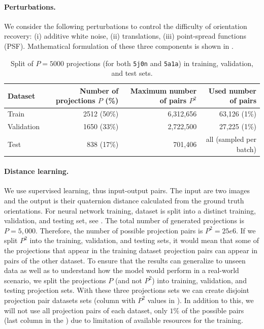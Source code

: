 \paragraph{Perturbations.}
We consider the following perturbations to control the difficulty of orientation recovery: (i) additive white noise, (ii) translations, (iii) point-spread functions (PSF). Mathematical formulation of these three components is shown in .

\begin{table}[ht!]
    \centering
    \begin{tabular}{lrrr}
        \toprule
        Dataset & Number of projections $P$ (\%) & Maximum number of pairs $P^2$ & Used number of pairs \\
        \midrule
        Train & 2512 (50\%) & 6,312,656 & 63,126 (1\%) \\
        Validation & 1650 (33\%) & 2,722,500 & 27,225 (1\%) \\
        Test & 838 (17\%) & 701,406 & all (sampled per batch) \\
        \bottomrule
    \end{tabular}
    \caption{
        Split of $P=5000$ projections (for both \texttt{5j0n} and \texttt{5a1a}) in training, validation, and test sets.
    }\label{tab:dataset}
\end{table}

\paragraph{Distance learning.}
We use supervised learning, thus input-output pairs.
The input are two images and the output is their quaternion distance calculated from the ground truth orientations.
For neural network training, dataset is split into a distinct training, validation, and testing set, see .
The total number of generated projections is $P = 5,000$. Therefore, the number of possible projection pairs is $P^2 = 25e6$. If we split $P^2$ into the training, validation, and testing sets, it would mean that some of the projections that appear in the training dataset projection pairs can appear in pairs of the other dataset. To ensure that the results can generalize to unseen data as well as to understand how the model would perform in a real-world scenario, we split the projections $P$ (and not $P^2$) into training, validation, and testing projection sets. With these three projections sets we can create disjoint projection pair datasets sets (column with $P^2$ values in ). In addition to this, we will not use all projection pairs of each dataset, only $1\%$ of the possible pairs (last column in the ) due to limitation of available resources for the training.


